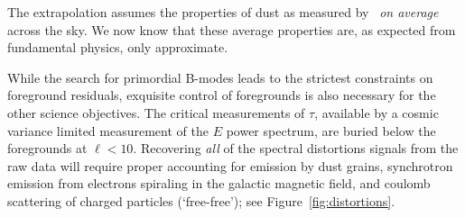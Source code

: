 The extrapolation assumes the properties of dust as measured by \planck\ {\it on average} across
the sky. We now know that these average properties are, as expected from fundamental physics, 
only approximate. 

While the search for primordial B-modes leads to the strictest constraints on foreground residuals, 
exquisite control of foregrounds is also necessary for the other science objectives. 
The critical measurements of $\tau$, available by a cosmic variance limited measurement of the $E$
power spectrum, are buried below the foregrounds at $\ell < 10$.  
Recovering {\it all} of the spectral distortions signals from the raw data will require proper accounting 
for emission by dust grains, synchrotron emission from electrons spiraling in the galactic magnetic 
field, and coulomb scattering of charged particles (`free-free'); see Figure~\ref{fig:distortions}.   







